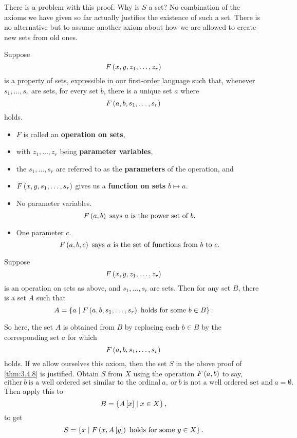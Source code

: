 There is a problem with this proof. Why is $ S $ a set? No combination of the axioms we have given so far actually justifies the existence of such a set. There is no alternative but to assume another axiom about how we are allowed to create new sets from old ones.

\pagebreak

\begin{definition}
\label{def:3.4.9}
Suppose
$$ F\left( x, y, z_1, \dots, z_r \right) $$
is a property of sets, expressible in our first-order language such that, whenever $ s_1, \dots, s_r $ are sets, for every set $ b $, there is a unique set $ a $ where
$$ F\left( a, b, s_1, \dots, s_r \right) $$
holds.
\begin{itemize}
\item $ F $ is called an \textbf{operation on sets},
\item with $ z_1, \dots, z_r $ being \textbf{parameter variables},
\item the $ s_1, \dots, s_r $ are referred to as the \textbf{parameters} of the operation, and
\item $ F\left( x, y, s_1, \dots, s_r \right) $ gives us a \textbf{function on sets} $ b \mapsto a $.
\end{itemize}
\end{definition}

\begin{example2}
\hfill
\begin{itemize}
\item No parameter variables.
$$ F\rb{a, b} \ \text{says} \ a \ \text{is the power set of} \ b. $$
\item One parameter $ c $.
$$ F\left( a, b, c \right) \ \text{says} \ a \ \text{is the set of functions from} \ b \ \text{to} \ c. $$
\end{itemize}
\end{example2}

\begin{axiom}
Suppose
$$ F\left( x, y, z_1, \dots, z_r \right) $$
is an operation on sets as above, and $ s_1, \dots, s_r $ are sets. Then for any set $ B $, there is a set $ A $ such that
$$ A = \left\{ a \mid F\left( a, b, s_1, \dots, s_r \right) \ \text{holds for some} \ b \in B \right\}. $$
\end{axiom}

So here, the set $ A $ is obtained from $ B $ by replacing each $ b \in B $ by the corresponding set $ a $ for which
$$ F\left( a, b, s_1, \dots, s_r \right) $$
holds. If we allow ourselves this axiom, then the set $ S $ in the above proof of \ref{thm:3.4.8} is justified. Obtain $ S $ from $ X $ using the operation $ F\left( a, b \right) $ to say,
$$ \text{either} \ b \ \text{is a well ordered set similar to the ordinal} \ a, \ \text{or} \ b \ \text{is not a well ordered set and} \ a = \emptyset. $$
Then apply this to
$$ B = \left\{ A\left[ x \right] \mid x \in X \right\}, $$
to get
$$ S = \left\{ x \mid F\left( x, A\left[ y \right] \right) \ \text{holds for some} \ y \in X \right\}. $$

